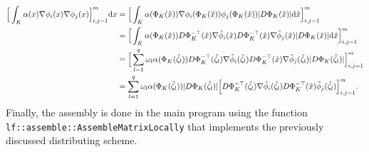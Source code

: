 \begin{align*}
\Big[\int_{K}\alpha(x) \nabla \phi_i(x) \nabla\phi_j(x)\Big]_{i,j=1}^{m} \text{d} x &= 
\Big[\int_{\hat{K}}\alpha(\Phi_K(\hat{x})) \nabla\phi_i(\Phi_K(\hat{x})) \phi_j(\Phi_K(\hat{x})) |D\Phi_K(\hat{x})| \text{d}\hat{x}\Big]_{i,j=1}^{m} \nonumber \\ 
&=\Big[\int_{\hat{K}}\alpha(\Phi_K(\hat{x})) D\Phi_K^{-\top} (\hat{x})\nabla\hat{\phi}_i(\hat{x}) D\Phi_K^{-\top} (\hat{x})\nabla\hat{\phi}_j(\hat{x}) |D\Phi_K(\hat{x})| \text{d}\hat{x}\Big]_{i,j=1}^{m} \nonumber \\ 
&=\Big[\sum_{l=1}^{q}\omega_l\alpha(\Phi_K(\hat{\zeta_l})) D\Phi_K^{-\top}(\hat{\zeta_l})\nabla\hat{\phi}_i(\hat{\zeta_l}) D\Phi_K^{-\top} (\hat{x})\nabla\hat{\phi}_j(\hat{\zeta_l}) |D\Phi_K(\hat{\zeta_l})| \Big]_{i,j=1}^{m} \nonumber \\ 
&=\sum_{l=1}^{q}\omega_l\alpha(\Phi_K(\hat{\zeta_l})) |D\Phi_K(\hat{\zeta_l})|\Big[D\Phi_K^{-\top}(\hat{\zeta_l})\nabla\hat{\phi}_i(\hat{\zeta_l}) D\Phi_K^{-\top} (\hat{x})\hat{\phi}_j(\hat{\zeta_l}) \Big]_{i,j=1}^{m}.
\end{align*}
Finally, the assembly is done in the main program using the function \lstinline{lf::assemble::AssembleMatrixLocally} that implements the previously discussed distributing scheme.

